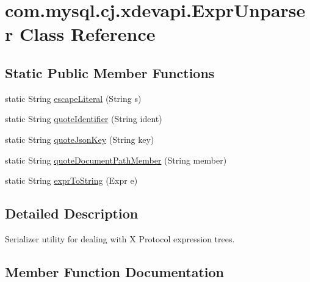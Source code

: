 \hypertarget{classcom_1_1mysql_1_1cj_1_1xdevapi_1_1_expr_unparser}{}\section{com.\+mysql.\+cj.\+xdevapi.\+Expr\+Unparser Class Reference}
\label{classcom_1_1mysql_1_1cj_1_1xdevapi_1_1_expr_unparser}
\subsection*{Static Public Member Functions}
\begin{DoxyCompactItemize}
\item 
static String \mbox{\hyperlink{classcom_1_1mysql_1_1cj_1_1xdevapi_1_1_expr_unparser_a3f26cf7209c6f96203ffdd8c650b1daa}{escape\+Literal}} (String s)
\item 
static String \mbox{\hyperlink{classcom_1_1mysql_1_1cj_1_1xdevapi_1_1_expr_unparser_a52a7b2d7c18161f35f023ee84c945a18}{quote\+Identifier}} (String ident)
\item 
static String \mbox{\hyperlink{classcom_1_1mysql_1_1cj_1_1xdevapi_1_1_expr_unparser_af9c17dbc6d53424297626f93e2bc1c1e}{quote\+Json\+Key}} (String key)
\item 
static String \mbox{\hyperlink{classcom_1_1mysql_1_1cj_1_1xdevapi_1_1_expr_unparser_aa9069ddb4fdddddcc2839161c40a97e1}{quote\+Document\+Path\+Member}} (String member)
\item 
static String \mbox{\hyperlink{classcom_1_1mysql_1_1cj_1_1xdevapi_1_1_expr_unparser_a1f7f5393339cc4696a3fd63c43fb2ca4}{expr\+To\+String}} (Expr e)
\end{DoxyCompactItemize}


\subsection{Detailed Description}
Serializer utility for dealing with X Protocol expression trees. 

\subsection{Member Function Documentation}
\mbox{\label{classcom_1_1mysql_1_1cj_1_1xdevapi_1_1_expr_unparser_a3f26cf7209c6f96203ffdd8c650b1daa}} 
